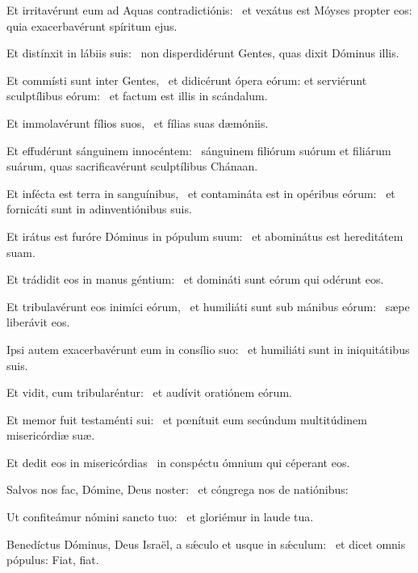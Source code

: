\item Et irritavérunt eum ad Aquas contradictiónis:~\psstar{} et vexátus est Móyses propter eos: quia exacerbavérunt spíritum ejus.

\item Et distínxit in lábiis suis:~\psstar{} non disperdidérunt Gentes, quas dixit Dóminus illis.

\item Et commísti sunt inter Gentes,~\pscross{} et didicérunt ópera eórum: et serviérunt sculptílibus eórum:~\psstar{} et factum est illis in scándalum.

\item Et immolavérunt fílios suos,~\psstar{} et fílias suas dæmóniis.

\item Et effudérunt sánguinem innocéntem:~\psstar{} sánguinem filiórum suórum et filiárum suárum, quas sacrificavérunt sculptílibus Chánaan.

\item Et infécta est terra in sanguínibus,~\pscross{} et contamináta est in opéribus eórum:~\psstar{} et fornicáti sunt in adinventiónibus suis.

\item Et irátus est furóre Dóminus in pópulum suum:~\psstar{} et abominátus est hereditátem suam.

\item Et trádidit eos in manus géntium:~\psstar{} et domináti sunt eórum qui odérunt eos.

\item Et tribulavérunt eos inimíci eórum,~\pscross{} et humiliáti sunt sub mánibus eórum:~\psstar{} sæpe liberávit eos.

\item Ipsi autem exacerbavérunt eum in consílio suo:~\psstar{} et humiliáti sunt in iniquitátibus suis.

\item Et vidit, cum tribularéntur:~\psstar{} et audívit oratiónem eórum.

\item Et memor fuit testaménti sui:~\psstar{} et pœnítuit eum secúndum multitúdinem misericórdiæ suæ.

\item Et dedit eos in misericórdias~\psstar{} in conspéctu ómnium qui céperant eos.

\item Salvos nos fac, Dómine, Deus noster:~\psstar{} et cóngrega nos de natiónibus:

\item Ut confiteámur nómini sancto tuo:~\psstar{} et gloriémur in laude tua.

\item Benedíctus Dóminus, Deus Israël, a sǽculo et usque in sǽculum:~\psstar{} et dicet omnis pópulus: Fiat, fiat.